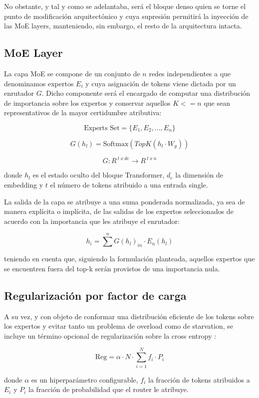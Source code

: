 \documentclass[10pt,twocolumn,a4paper]{article}
\begin{document}
No obstante, y tal y como se adelantaba, será el bloque denso quien se torne el punto de modificación arquitectónico y cuya supresión permitirá la inyección de las MoE layers, manteniendo, sin embargo, el resto de la arquitectura intacta.


\subsection{MoE Layer}
\label{sec:moe}

La capa MoE se compone de un conjunto de $n$ redes independientes a que denominamos expertos $E_i$ y cuya asignación de tokens viene dictada por un enrutador $G$. Dicho componente será el encargado de computar una distribución de importancia sobre los expertos y  conservar aquellos $K<=n$ que sean representativos de la mayor certidumbre atributiva:

$$\text{Experts Set} = \{E_1, E_2, ..., E_n\}$$

$$G(h_{l}) = \text{Softmax}(TopK(h_l \cdot W_g))$$

$$G: R^{\:t\: x \: de}\xrightarrow{} R^{\:t\:x\:n}$$

donde $h_{l}$ es el estado oculto  del bloque Transformer, $d_e$ la dimensión de embedding y $t$ el número de tokens atribuido a una entrada single.

La salida de la capa se atribuye a  una suma ponderada normalizada, ya sea de manera explícita o implícita,
de las salidas de los expertos seleccionados de acuerdo con la importancia que les atribuye el enrutador:

$$h_{i} = \sum^n G(h_l)_{in} \cdot E_n(h_l)$$

teniendo en cuenta que, siguiendo la formulación planteada, aquellos expertos que se encuentren fuera del top-k serán provistos de una importancia nula.

\subsection{Regularización por factor de carga}
A su vez, y con objeto de conformar una distribución eficiente de los tokens sobre los expertos y evitar tanto un problema de overload como de starvation, se incluye un término  opcional de regularización sobre la cross entropy \citep{fedus2022switch}:


$$\text{Reg} = \alpha \cdot N \cdot \sum_{i=1}^{N} f_i \cdot P_i$$
\label{sec:base}

donde $\alpha$ es un hiperparámetro configurable, $f_i$ la fracción de tokens atribuidos a $E_i$ y $P_i$ la fracción de probabilidad  que  el router le atribuye. %
\end{document}
